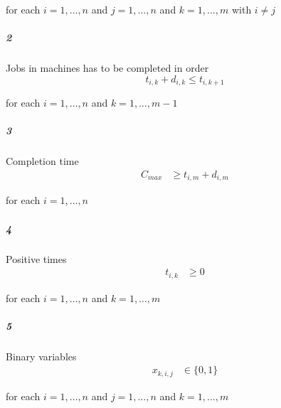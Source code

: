 \documentclass{article}
\begin{document}
for each $i = 1,\dots,n$ and $j = 1,\dots,n$ and $k = 1,\dots,m$ with $i \neq j$
\subparagraph{2} Jobs in machines has to be completed in order
\begin{equation*}
t_{i,k} + d_{i,k} \leq t_{i,k+1} 
\end{equation*}

for each  $i=1,\dots,n$ and $k=1,\dots,m-1$
\subparagraph{3} Completion time
\begin{align*}
C_{max} &\geq t_{i,m} + d_{i,m}
\end{align*}

for each $i=1,\dots,n$
\subparagraph{4} Positive times
\begin{align*}
t_{i,k} &\geq 0 
\end{align*}

for each  $i=1,\dots,n$ and $k=1,\dots,m$
\subparagraph{5} Binary variables
\begin{align*}
x_{k,i,j} &\in \{0,1\}
\end{align*}

for each  $i = 1,\dots,n$ and $j = 1,\dots,n$ and $k = 1,\dots,m$
\end{document}
